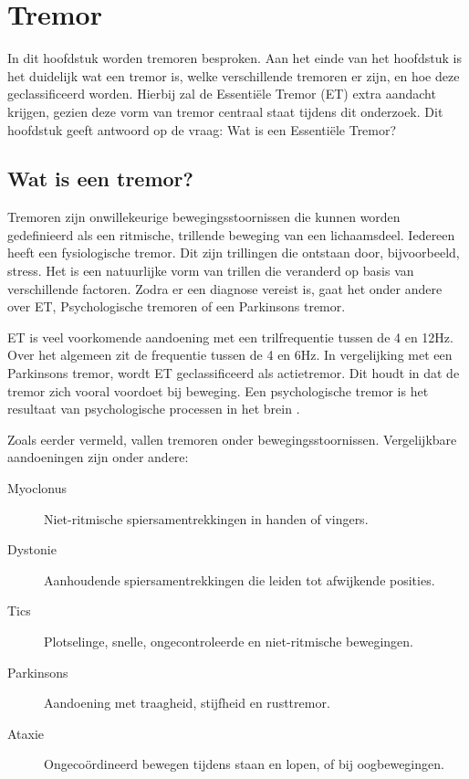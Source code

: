 \section{Tremor}
\label{section:tremor}

In dit hoofdstuk worden tremoren besproken.
Aan het einde van het hoofdstuk is het duidelijk wat een tremor is,
welke verschillende tremoren er zijn, en hoe deze geclassificeerd worden.
Hierbij zal de Essentiële Tremor (ET) extra aandacht krijgen,
gezien deze vorm van tremor centraal staat tijdens dit onderzoek.
Dit hoofdstuk geeft antwoord op de vraag: Wat is een Essentiële Tremor?

\subsection{Wat is een tremor?}

Tremoren zijn onwillekeurige bewegingsstoornissen die kunnen worden gedefinieerd als een ritmische,
trillende beweging van een lichaamsdeel\cite{knf2022}.
Iedereen heeft een fysiologische tremor. Dit zijn trillingen die ontstaan door, bijvoorbeeld, stress.
Het is een natuurlijke vorm van trillen die veranderd op basis van verschillende factoren\cite{hersenstichting2024,erasmus2022}.
Zodra er een diagnose vereist is, gaat het onder andere over ET,
Psychologische tremoren of een Parkinsons tremor\cite{elsevier2022}.

ET is veel voorkomende aandoening met een trilfrequentie tussen de 4 en 12Hz.
Over het algemeen zit de frequentie tussen de 4 en 6Hz\cite{frontiers2022}.
In vergelijking met een Parkinsons tremor, wordt ET geclassificeerd als actietremor.
Dit houdt in dat de tremor zich vooral voordoet bij beweging\cite{knf2022,frontiers2022,elsevier2022}.
Een psychologische tremor is het resultaat van psychologische processen in het brein \cite{elsevier2022}.

Zoals eerder vermeld, vallen tremoren onder bewegingsstoornissen.
Vergelijkbare aandoeningen zijn onder andere:

\begin{description}
    \item[Myoclonus] Niet-ritmische spiersamentrekkingen in handen of vingers\cite{knf2022}.
    \item[Dystonie] Aanhoudende spiersamentrekkingen die leiden tot afwijkende posities\cite{knf2022,elsevier2022,erasmus2022}.
    \item[Tics] Plotselinge, snelle, ongecontroleerde en niet-ritmische bewegingen\cite{knf2022}.
    \item[Parkinsons] Aandoening met traagheid, stijfheid en rusttremor\cite{knf2022,frontiers2022,elsevier2022,erasmus2022}.
    \item[Ataxie] Ongecoördineerd bewegen tijdens staan en lopen, of bij oogbewegingen\cite{knf2022}.
\end{description}

